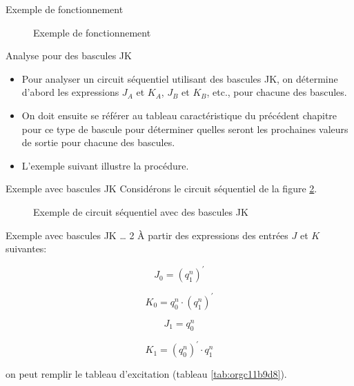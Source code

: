 \documentclass[presentation]{beamer}
\begin{document}
\begin{frame}[label={sec:orge08877c}]{Exemple de fonctionnement}
\begin{figure}[htbp]
\centering

\caption{\label{fig:org827882f}Exemple de fonctionnement}
\end{figure}
\end{frame}

\begin{frame}[label={sec:org94968e4}]{Analyse pour des bascules JK}
\begin{itemize}
\item Pour analyser un circuit séquentiel utilisant des bascules JK, on détermine d'abord les expressions \(J_A\) et \(K_A\), \(J_B\) et \(K_B\), etc., pour chacune des bascules.

\item On doit ensuite se référer au tableau caractéristique du précédent chapitre pour ce type de bascule pour déterminer quelles seront les prochaines valeurs de sortie pour chacune des bascules.

\item L'exemple suivant illustre la procédure.
\end{itemize}
\end{frame}

\begin{frame}[label={sec:org0e75bde}]{Exemple avec bascules JK}
Considérons le circuit séquentiel de la figure \ref{fig:orgab1de13}.

\begin{figure}[htbp]
\centering

\caption{\label{fig:orgab1de13}Exemple de circuit séquentiel avec des bascules JK}
\end{figure}
\end{frame}

\begin{frame}[label={sec:orgc6f7092}]{Exemple avec bascules JK \ldots{} 2}
À partir des expressions des entrées \(J\) et \(K\) suivantes:

$$ J_0 = (q_1^{n})^\prime $$

$$ K_0 = q_0^{n} \cdot (q_1^{n})^\prime $$

$$ J_1 = q_0^{n} $$

$$ K_1 = (q_0^{n})^\prime \cdot q_1^{n} $$

on peut remplir le tableau d'excitation (tableau \ref{tab:orgc11b9d8}).
\end{frame}
\end{document}
